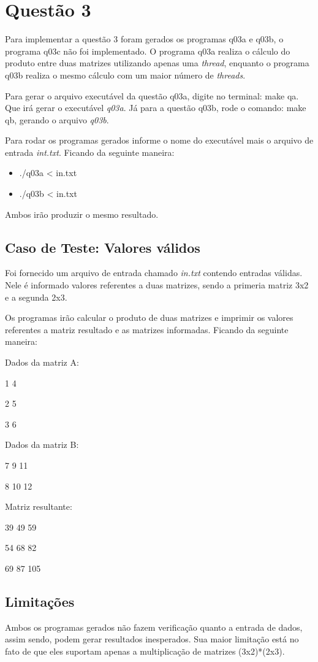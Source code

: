 \section{Questão 3}

  Para implementar a questão 3 foram gerados os programas q03a e q03b, o programa q03c não foi implementado. O programa q03a realiza o cálculo do produto entre duas matrizes utilizando apenas uma \textit{thread}, enquanto o programa q03b realiza o mesmo cálculo com um maior número de \textit{threads}.

  Para gerar o arquivo executável da questão q03a, digite no terminal: make qa. Que irá gerar o executável \textit{q03a}. Já para a questão q03b, rode o comando: make qb, gerando o arquivo \textit{q03b}.

  Para rodar os programas gerados informe o nome do executável mais o arquivo de entrada \textit{int.txt}. Ficando da seguinte maneira:

  \begin{itemize}
    \item ./q03a < in.txt
    \item ./q03b < in.txt
  \end{itemize}

  Ambos irão produzir o mesmo resultado.

  \subsection{Caso de Teste: Valores válidos}

    Foi fornecido um arquivo de entrada chamado \textit{in.txt} contendo entradas válidas. Nele é informado valores referentes a duas matrizes, sendo a primeria matriz 3x2 e a segunda 2x3.

    Os programas irão calcular o produto de duas matrizes e imprimir os valores referentes a matriz resultado e as matrizes informadas. Ficando da seguinte maneira:


Dados da matriz A:

1 4


2 5


3 6


Dados da matriz B:

7 9 11

8 10 12

Matriz resultante:

39 49 59

54 68 82

69 87 105

\subsection{Limitações}

Ambos os programas gerados não fazem verificação quanto a entrada de dados, assim sendo, podem gerar resultados inesperados. Sua maior limitação está no fato de que eles suportam apenas a multiplicação de matrizes (3x2)*(2x3).
